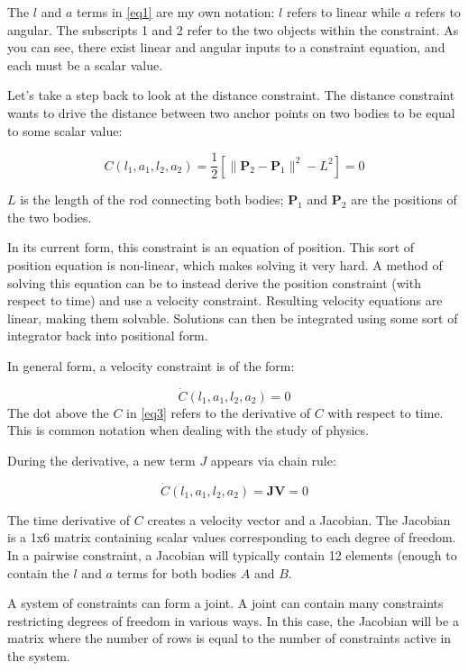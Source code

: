 The \(l\) and \(a\) terms in \eqref{eq1} are my own notation: \(l\) refers to linear while \(a\) refers to angular. The subscripts 1 and 2 refer to the two objects within the constraint. As you can see, there exist linear and angular inputs to a constraint equation, and each must be a scalar value.

Let's take a step back to look at the distance constraint. The distance constraint wants to drive the distance between two anchor points on two bodies to be equal to some scalar value:

\begin{equation}
C( l_1, a_1, l_2, a_2 ) = \frac{1}{2}[\|\mathbf{P}_2 - \mathbf{P}_1\|^2 - L^2] = 0
\label{eq2}
\end{equation}

\(L\) is the length of the rod connecting both bodies; \(\mathbf{P}_1\) and \(\mathbf{P}_2\) are the positions of the two bodies.

In its current form, this constraint is an equation of position. This sort of position equation is non-linear, which makes solving it very hard. A method of solving this equation can be to instead derive the position constraint (with respect to time) and use a velocity constraint. Resulting velocity equations are linear, making them solvable. Solutions can then be integrated using some sort of integrator back into positional form.

In general form, a velocity constraint is of the form:

\begin{equation}
\dot{C}( l_1, a_1, l_2, a_2 ) = 0
\label{eq3}
\end{equation}
The dot above the \(C\) in \eqref{eq3} refers to the derivative of \(C\) with respect to time. This is common notation when dealing with the study of physics.

During the derivative, a new term \(J\) appears via chain rule:

\begin{equation}
\dot{C}( l_1, a_1, l_2, a_2 ) = \mathbf{JV} = 0
\label{eq4}
\end{equation}

The time derivative of \(C\) creates a velocity vector and a Jacobian. The Jacobian is a 1x6 matrix containing scalar values corresponding to each degree of freedom. In a pairwise constraint, a Jacobian will typically contain 12 elements (enough to contain the \(l\) and \(a\) terms for both bodies \(A\) and \(B\).

A system of constraints can form a joint. A joint can contain many constraints restricting degrees of freedom in various ways. In this case, the Jacobian will be a matrix where the number of rows is equal to the number of constraints active in the system.

